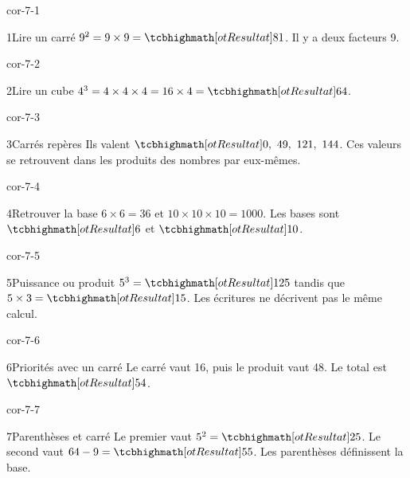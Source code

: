 \clearpage\pagestyle{otMain}\setlength{\otBlocEspacement}{2.5mm}\fontsize{11}{15}\selectfont{}
\begin{blocLivre}{cor-7-1}\begin{corrige}{1}{Lire un carré}
$9^2=9\times9=\res{81}$. Il y a deux facteurs 9.
\end{corrige}\end{blocLivre}
\begin{blocLivre}{cor-7-2}\begin{corrige}{2}{Lire un cube}
$4^3=4\times4\times4=16\times4=\res{64}$.
\end{corrige}\end{blocLivre}
\begin{blocLivre}{cor-7-3}\begin{corrige}{3}{Carrés repères}
Ils valent $\res{0,\ 49,\ 121,\ 144}$. Ces valeurs se retrouvent dans les produits des nombres par eux-mêmes.
\end{corrige}\end{blocLivre}
\begin{blocLivre}{cor-7-4}\begin{corrige}{4}{Retrouver la base}
$6\times6=36$ et $10\times10\times10=1000$. Les bases sont $\res6$ et $\res{10}$.
\end{corrige}\end{blocLivre}
\begin{blocLivre}{cor-7-5}\begin{corrige}{5}{Puissance ou produit}
$5^3=\res{125}$ tandis que $5\times3=\res{15}$. Les écritures ne décrivent pas le même calcul.
\end{corrige}\end{blocLivre}
\begin{blocLivre}{cor-7-6}\begin{corrige}{6}{Priorités avec un carré}
Le carré vaut 16, puis le produit vaut 48. Le total est $\res{54}$.
\end{corrige}\end{blocLivre}
\begin{blocLivre}{cor-7-7}\begin{corrige}{7}{Parenthèses et carré}
Le premier vaut $5^2=\res{25}$. Le second vaut $64-9=\res{55}$. Les parenthèses définissent la base.
\end{corrige}\end{blocLivre}
